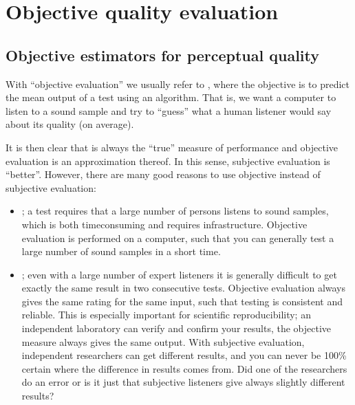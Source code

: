 \documentclass[letterpaper,10pt,english]{jupyterBook}
\begin{document}
\sphinxstepscope


\section{Objective quality evaluation}
\label{\detokenize{Evaluation/Objective_quality_evaluation:objective-quality-evaluation}}\label{\detokenize{Evaluation/Objective_quality_evaluation::doc}}

\subsection{Objective estimators for perceptual quality}
\label{\detokenize{Evaluation/Objective_quality_evaluation:objective-estimators-for-perceptual-quality}}
\sphinxAtStartPar
With “objective evaluation” we usually refer to , where the objective is to predict the mean output
of a {\hyperref[\detokenize{Evaluation/Subjective_quality_evaluation::doc}]{}} test using an
algorithm. That is, we want a computer to listen to a sound sample and
try to “guess” what a human listener would say about its quality (on
average).

\sphinxAtStartPar
It is then clear that {\hyperref[\detokenize{Evaluation/Subjective_quality_evaluation::doc}]{}} is always the “true” measure
of performance and objective evaluation is an approximation thereof. In
this sense, subjective evaluation is “better”. However, there are many
good reasons to use objective instead of subjective evaluation:
\begin{itemize}
\item {} 
\sphinxAtStartPar
{}; a test requires that a large
number of persons listens to sound samples, which is both
time\sphinxhyphen{}consuming and requires infrastructure. Objective evaluation is
performed on a computer, such that you can generally test a large
number of sound samples in a short time.

\item {} 
\sphinxAtStartPar
{}; even with a large number of expert
listeners it is generally difficult to get exactly the same result
in two consecutive tests. Objective evaluation always gives the same
rating for the same input, such that testing is consistent and
reliable. This is especially important for scientific
reproducibility; an independent laboratory can verify and confirm
your results, the objective measure always gives the same output.
With subjective evaluation, independent researchers can get
different results, and you can never be 100\% certain where the
difference in results comes from. Did one of the researchers do an
error or is it just that subjective listeners give always slightly
different results?

\end{itemize}
\end{document}
